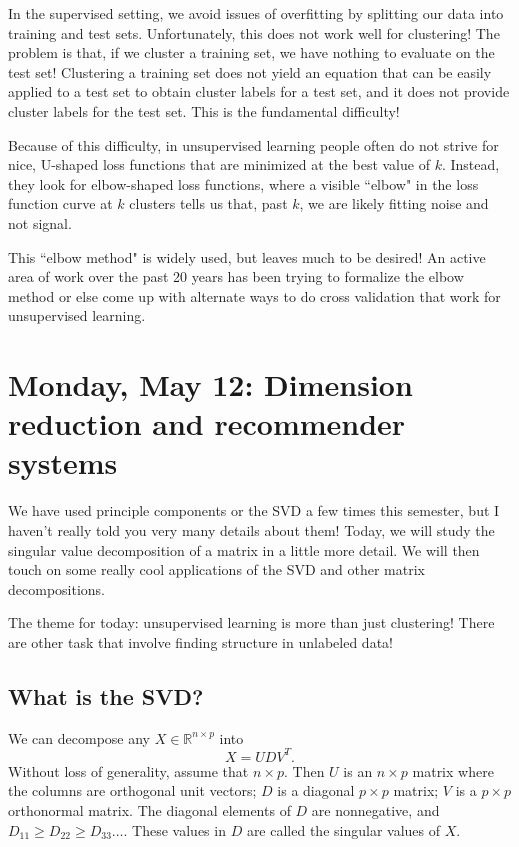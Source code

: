 In the supervised setting, we avoid issues of overfitting by splitting our data into training and test sets. Unfortunately, this does not work well for clustering! The problem is that, if we cluster a training set, we have nothing to evaluate on the test set! Clustering a training set does not yield an equation that can be easily applied to a test set to obtain cluster labels for a test set, and it does not provide cluster labels for the test set. This is the fundamental difficulty! 

Because of this difficulty, in unsupervised learning people often do not strive for nice, U-shaped loss functions that are minimized at the best value of $k$. Instead, they look for elbow-shaped loss functions, where a visible ``elbow" in the loss function curve at $k$ clusters tells us that, past $k$, we are likely fitting noise and not signal. 

This ``elbow method" is widely used, but leaves much to be desired! An active area of work over the past 20 years has been trying to formalize the elbow method or else come up with alternate ways to do cross validation that work for unsupervised learning. 


\section{Monday, May 12: Dimension reduction and recommender systems}

We have used principle components or the SVD a few times this semester, but I haven't really told you very many details about them! Today, we will study the singular value decomposition of a matrix in a little more detail. We will then touch on some really cool applications of the SVD and other matrix decompositions. 

The theme for today: unsupervised learning is more than just clustering! There are other task that involve finding structure in unlabeled data!

\subsection{What is the SVD?}

We can decompose any $X \in \mathbb{R}^{n \times p}$ into
$$
X = U D V^T.
$$
Without loss of generality, assume that $n \times p$. Then $U$ is an $n \times p$ matrix where the columns are orthogonal unit vectors; $D$ is a diagonal $p \times p$ matrix; $V$ is a $p \times p$ orthonormal matrix. The diagonal elements of $D$ are nonnegative, and $D_{11} \geq D_{22} \geq D_{33} \ldots$. These values in $D$ are called the singular values of $X$. 

